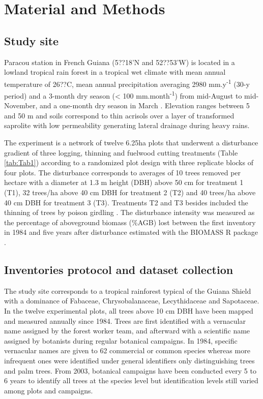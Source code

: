 \documentclass[fleqn,10pt]{ArtEcoFoG} %
\begin{document}
\section{Material and Methods}\label{material-and-methods}

\subsection{Study site}\label{study-site}

Paracou station in French Guiana (5??18'N and 52??53'W) is located in a
lowland tropical rain forest in a tropical wet climate with mean annual
temperature of 26??C, mean annual precipitation averaging 2980
mm.y\textsuperscript{-1} (30-y period) and a 3-month dry season
(\textless{} 100 mm.month\textsuperscript{-1}) from mid-August to
mid-November, and a one-month dry season in March \citep{Wagner2011}.
Elevation ranges between 5 and 50 m and soils correspond to thin
acrisols over a layer of transformed saprolite with low permeability
generating lateral drainage during heavy rains.

The experiment is a network of twelve 6.25ha plots that underwent a
disturbance gradient of three logging, thinning and fuelwood cutting
treatments (Table \ref{tab:Tab1}) according to a randomized plot design
with three replicate blocks of four plots. The disturbance corresponds
to averages of 10 trees removed per hectare with a diameter at 1.3 m
height (DBH) above 50 cm for treatment 1 (T1), 32 trees/ha above 40 cm
DBH for treatment 2 (T2) and 40 trees/ha above 40 cm DBH for treatment 3
(T3). Treatments T2 and T3 besides included the thinning of trees by
poison girdling \citep{Schmitt1990, Blanc2009}. The disturbance
intensity was measured as the percentage of aboveground biomass (\%AGB)
lost between the first inventory in 1984 and five years after
disturbance \citep{Piponiot2016} estimated with the BIOMASS R package
\citep{Biomass2018}.

\subsection{Inventories protocol and dataset
collection}\label{inventories-protocol-and-dataset-collection}

The study site corresponds to a tropical rainforest typical of the
Guiana Shield with a dominance of Fabaceae, Chrysobalanaceae,
Lecythidaceae and Sapotaceae. In the twelve experimental plots, all
trees above 10 cm DBH have been mapped and measured annually since 1984.
Trees are first identified with a vernacular name assigned by the forest
worker team, and afterward with a scientific name assigned by botanists
during regular botanical campaigns. In 1984, specific vernacular names
are given to 62 commercial or common species whereas more infrequent
ones were identified under general identifiers only distinguishing trees
and palm trees. From 2003, botanical campaigns have been conducted every
5 to 6 years to identify all trees at the species level but
identification levels still varied among plots and campaigns.
\end{document}
